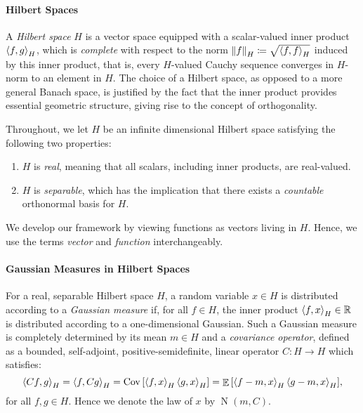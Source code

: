 \paragraph{Hilbert Spaces}
A \textit{Hilbert space} \(H\) is a vector space equipped with a scalar-valued inner product \(\ev{f, g}_{H}\), which is \textit{complete} with respect to the norm \(\norm{f}_{H} \coloneqq \sqrt{\ev{f, f}_{H}}\) induced by this inner product, that is, every \(H\)-valued Cauchy sequence converges in \(H\)-norm to an element in \(H\). The choice of a Hilbert space, as opposed to a more general Banach space, is justified by the fact that the inner product provides essential geometric structure, giving rise to the concept of orthogonality.

Throughout, we let \(H\) be an infinite dimensional Hilbert space satisfying the following two properties:
\begin{enumerate}
  \item \(H\) is \textit{real}, meaning that all scalars, including inner products, are real-valued.
  \item \(H\) is \textit{separable}, which has the implication that there exists a \textit{countable} orthonormal basis for \(H\).
\end{enumerate}

We develop our framework by viewing functions as vectors living in \(H\). Hence, we use the terms \textit{vector} and \textit{function} interchangeably.



\paragraph{Gaussian Measures in Hilbert Spaces}
For a real, separable Hilbert space \(H\), a random variable \(x \in H\) is distributed according to a \textit{Gaussian measure}  if, for all \(f \in H\), the inner product \(\ev{f, x}_{H} \in \mathbb{R}\) is distributed according to a one-dimensional Gaussian. Such a Gaussian measure is completely determined by its mean \(m \in H\) and a \textit{covariance operator}, defined as a bounded, self-adjoint, positive-semidefinite, linear operator \(C : H \to H\) which satisfies:
\[
  \ev{Cf, g}_{H} = \ev{f, Cg}_{H} = \operatorname{Cov}\qty[\ev{f, x}_{H} \ev{g, x}_{H}] = \mathop{\mathbb{E}}\qty[\ev{f - m, x}_{H} \ev{g - m, x}_{H}],
\]
for all \(f, g \in H\). Hence we denote the law of \(x\) by \(\operatorname{N}(m, C)\).

